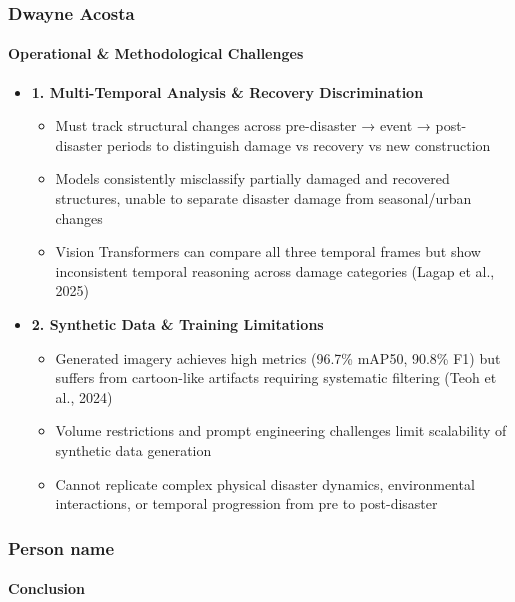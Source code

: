\documentclass{beamer}
\newcommand{\namedframe}[3]{
  \begin{frame}
    \frametitle{#1}
    \framesubtitle{#2}
    #3
  \end{frame}
}
\begin{document}
\namedframe{Dwayne Acosta}{Operational \& Methodological Challenges}{
\begin{itemize}
    \item \textbf{1. Multi-Temporal Analysis \& Recovery Discrimination}
    \begin{itemize}
        \item Must track structural changes across pre-disaster → event → post-disaster periods to distinguish damage vs recovery vs new construction
        \item Models consistently misclassify partially damaged and recovered structures, unable to separate disaster damage from seasonal/urban changes
        \item Vision Transformers can compare all three temporal frames but show inconsistent temporal reasoning across damage categories (Lagap et al., 2025)
    \end{itemize}
    
    \item \textbf{2. Synthetic Data \& Training Limitations}
    \begin{itemize}
        \item Generated imagery achieves high metrics (96.7\% mAP50, 90.8\% F1) but suffers from cartoon-like artifacts requiring systematic filtering (Teoh et al., 2024)
        \item Volume restrictions and prompt engineering challenges limit scalability of synthetic data generation
        \item Cannot replicate complex physical disaster dynamics, environmental interactions, or temporal progression from pre to post-disaster
    \end{itemize}
\end{itemize}
}
\namedframe{Person name}{Conclusion}{

}
\end{document}
